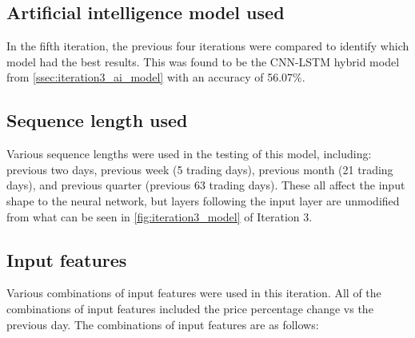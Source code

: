 \subsection{Artificial intelligence model used}\label{ssec:iteration5_ai_model}
In the fifth iteration, the previous four iterations were compared to identify which model had the best results.
This was found to be the CNN-LSTM hybrid model from \autoref{ssec:iteration3_ai_model} with an accuracy of 56.07\%.

\subsection{Sequence length used}
Various sequence lengths were used in the testing of this model, including: previous two days,
previous week (5 trading days), previous month (21 trading days), and previous quarter (previous 63 trading days).
These all affect the input shape to the neural network, but layers following the input layer are unmodified from
what can be seen in \autoref{fig:iteration3_model} of Iteration 3.

\subsection{Input features}\label{ssec:iteration5_input_features}
Various combinations of input features were used in this iteration. All of the combinations of input features included the
price percentage change vs the previous day. The combinations of input features are as follows:

